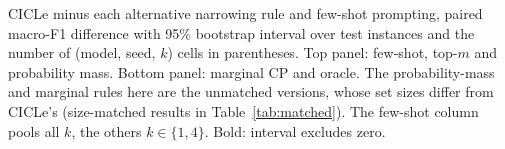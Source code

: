 \begin{table}[t]
  \centering
  \scriptsize
  \setlength{\tabcolsep}{3pt}
  \resizebox{\textwidth}{!}{}\par\medskip
  \resizebox{\textwidth}{!}{}
  \caption{CICLe minus each alternative narrowing rule and few-shot prompting, paired macro-F1 difference with 95\% bootstrap interval over test instances and the number of (model, seed, $k$) cells in parentheses. Top panel: few-shot, top-$m$ and probability mass. Bottom panel: marginal CP and oracle. The probability-mass and marginal rules here are the unmatched versions, whose set sizes differ from CICLe's (size-matched results in Table~\ref{tab:matched}). The few-shot column pools all $k$, the others $k \in \{1, 4\}$. Bold: interval excludes zero.}
  \label{tab:narrowing}
\end{table}
